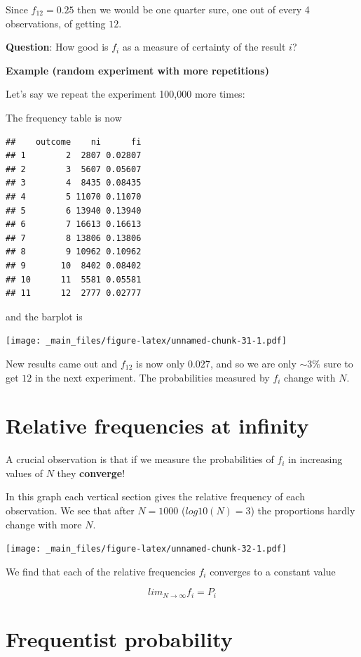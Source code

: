 \documentclass[
]{book}
\begin{document}
Since \(f_{12}=0.25\) then we would be one quarter sure, one out of every 4 observations, of getting \(12\).

\textbf{Question}: How good is \(f_i\) as a measure of certainty of the result \(i\)?

\textbf{Example (random experiment with more repetitions)}

Let's say we repeat the experiment 100,000 more times:

The frequency table is now

\begin{verbatim}
##    outcome    ni      fi
## 1        2  2807 0.02807
## 2        3  5607 0.05607
## 3        4  8435 0.08435
## 4        5 11070 0.11070
## 5        6 13940 0.13940
## 6        7 16613 0.16613
## 7        8 13806 0.13806
## 8        9 10962 0.10962
## 9       10  8402 0.08402
## 10      11  5581 0.05581
## 11      12  2777 0.02777
\end{verbatim}

and the barplot is

\texttt{[image: \_main\_files/figure-latex/unnamed-chunk-31-1.pdf]}

New results came out and \(f_{12}\) is now only \(0.027\), and so we are only \(\sim 3\%\) sure to get \(12\) in the next experiment. The probabilities measured by \(f_i\) change with \(N\).

\hypertarget{relative-frequencies-at-infinity}{%
\section{Relative frequencies at infinity}\label{relative-frequencies-at-infinity}}

A crucial observation is that if we measure the probabilities of \(f_i\) in increasing values of \(N\) they \textbf{converge}!

In this graph each vertical section gives the relative frequency of each observation. We see that after \(N=1000\) (\(log10(N)=3\)) the proportions hardly change with more \(N\).

\texttt{[image: \_main\_files/figure-latex/unnamed-chunk-32-1.pdf]}

We find that each of the relative frequencies \(f_i\) converges to a constant value

\[lim_{N\rightarrow \infty} f_i = P_i\]

\hypertarget{frequentist-probability}{%
\section{Frequentist probability}\label{frequentist-probability}}
\end{document}
